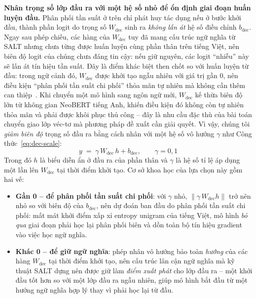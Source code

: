 \textbf{Nhân trọng số lớp đầu ra với một hệ số nhỏ để ổn định giai đoạn huấn luyện đầu.}\label{subsec:dec-scale}
Phân phối tần suất ở trên chỉ phát huy tác dụng nếu ở bước khởi đầu, thành phần logit do
trọng số $W_{\mathrm{dec}}$ sinh ra \textit{không lấn át} hệ số điều chỉnh $b_{\mathrm{dec}}$. Ngay
sau phép chiếu, các hàng của $W_{\mathrm{dec}}$ tuy đã mang cấu trúc ngữ nghĩa từ SALT nhưng
chưa từng được huấn luyện cùng phần thân trên tiếng Việt, nên biên độ logit của chúng chưa
đáng tin cậy: nếu giữ nguyên, các logit ``nhiễu'' này sẽ lấn át tín hiệu tần suất. Đây là điểm
khác biệt then chốt so với huấn luyện từ đầu: trong ngữ cảnh đó, $W_{\mathrm{dec}}$ được khởi
tạo ngẫu nhiên với giá trị gần 0, nên điều kiện ``phân phối tần suất chi phối'' thỏa mãn tự nhiên mà
không cần thêm can thiệp~\cite{meister2022naturalbias}. Khi chuyển một mô hình sang ngôn ngữ mới,
$W_{\mathrm{dec}}$ kế thừa biên độ lớn từ không gian NeoBERT tiếng Anh, khiến điều kiện đó
không còn tự nhiên thỏa mãn và phải được khôi phục thủ công -- đây là nhu cầu đặc thù của bài
toán chuyển giao lớp véc-tơ mà phương pháp đề xuất cần giải quyết. Vì
vậy, chúng tôi \textit{giảm biên độ} trọng số đầu ra bằng cách nhân với một hệ số vô hướng $\gamma$ như
Công thức~\eqref{eq:dec-scale}:
\begin{equation}
  \label{eq:dec-scale}
  y \;=\; \gamma\, W_{\mathrm{dec}}\, h + b_{\mathrm{dec}}, \qquad \gamma = 0{,}1
\end{equation}
Trong đó $h$ là biểu diễn ẩn ở đầu ra của phần thân và $\gamma$ là hệ số tỉ lệ áp dụng một lần
lên $W_{\mathrm{dec}}$ tại thời điểm khởi tạo. Cơ sở khoa học của lựa chọn này gồm hai vế:
\begin{itemize}
  \item \textbf{Gần 0 -- để phân phối tần suất chi phối}: với $\gamma$ nhỏ, $\lVert \gamma\,
        W_{\mathrm{dec}} h \rVert$ trở nên nhỏ so với biên độ của $b_{\mathrm{dec}}$, nên
        dự đoán ban đầu do phân phối tần suất chi phối: mất mát khởi điểm xấp xỉ
        entropy unigram của tiếng Việt, mô hình \textit{bỏ qua} giai đoạn phải học lại phân
        phối biên và dồn toàn bộ tín hiệu gradient vào việc học ngữ nghĩa.
  \item \textbf{Khác 0 -- để giữ ngữ nghĩa}: phép nhân vô hướng bảo toàn \textit{hướng} của
        các hàng $W_{\mathrm{dec}}$ tại thời điểm khởi tạo, nên cấu trúc lân cận ngữ nghĩa mà
        kỹ thuật SALT dựng nên được giữ làm \textit{điểm xuất phát} cho lớp đầu ra -- một
        khởi đầu tốt hơn so với một lớp đầu ra ngẫu nhiên, giúp mô hình bắt đầu từ một
        hướng ngữ nghĩa hợp lý thay vì phải học lại từ đầu.
\end{itemize}

